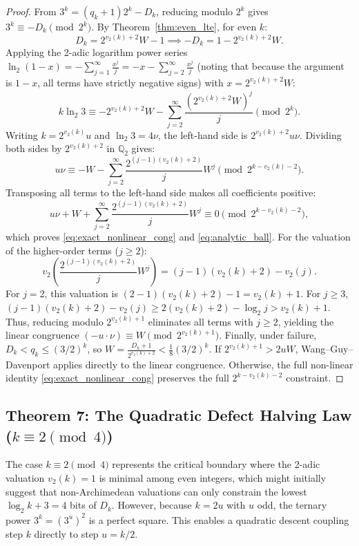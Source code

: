 \documentclass[11pt,reqno]{amsart}
\theoremstyle{definition}
\numberwithin{equation}{section}
\begin{document}
\begin{proof}
From $3^k = (q_k + 1)2^k - D_k$, reducing modulo $2^k$ gives $3^k \equiv -D_k \pmod{2^k}$.
By Theorem~\ref{thm:even_lte}, for even $k$:
\[
D_k = 2^{v_2(k)+2} W - 1 \implies -D_k = 1 - 2^{v_2(k)+2} W.
\]
Applying the 2-adic logarithm power series $\ln_2(1 - x) = -\sum_{j=1}^\infty \frac{x^j}{j} = -x - \sum_{j=2}^\infty \frac{x^j}{j}$ (noting that because the argument is $1 - x$, all terms have strictly negative signs) with $x = 2^{v_2(k)+2} W$:
\[
k \ln_2 3 \equiv -2^{v_2(k)+2} W - \sum_{j=2}^\infty \frac{(2^{v_2(k)+2} W)^j}{j} \pmod{2^k}.
\]
Writing $k = 2^{v_2(k)} u$ and $\ln_2 3 = 4 \nu$, the left-hand side is $2^{v_2(k)+2} u \nu$. Dividing both sides by $2^{v_2(k)+2}$ in $\mathbb{Q}_2$ gives:
\[
u \nu \equiv -W - \sum_{j=2}^\infty \frac{2^{(j-1)(v_2(k)+2)}}{j} W^j \pmod{2^{k - v_2(k) - 2}}.
\]
Transposing all terms to the left-hand side makes all coefficients positive:
\[
u \nu + W + \sum_{j=2}^\infty \frac{2^{(j-1)(v_2(k)+2)}}{j} W^j \equiv 0 \pmod{2^{k - v_2(k) - 2}},
\]
which proves \eqref{eq:exact_nonlinear_cong} and \eqref{eq:analytic_ball}.
For the valuation of the higher-order terms ($j \ge 2$):
\[
v_2\left( \frac{2^{(j-1)(v_2(k)+2)}}{j} W^j \right) = (j-1)(v_2(k)+2) - v_2(j).
\]
For $j = 2$, this valuation is $(2-1)(v_2(k)+2) - 1 = v_2(k) + 1$.
For $j \ge 3$, $(j-1)(v_2(k)+2) - v_2(j) \ge 2(v_2(k)+2) - \log_2 j > v_2(k)+1$.
Thus, reducing modulo $2^{v_2(k)+1}$ eliminates all terms with $j \ge 2$, yielding the linear congruence $(-u \cdot \nu) \equiv W \pmod{2^{v_2(k)+1}}$.
Finally, under failure, $D_k < q_k \le (3/2)^k$, so $W = \frac{D_k + 1}{2^{v_2(k)+2}} < \frac{1}{8}(3/2)^k$. If $2^{v_2(k)+1} > 2 u W$, Wang--Guy--Davenport applies directly to the linear congruence. Otherwise, the full non-linear identity \eqref{eq:exact_nonlinear_cong} preserves the full $2^{k - v_2(k) - 2}$ constraint.
\end{proof}

\subsection{\texorpdfstring{Theorem 7: The Quadratic Defect Halving Law ($k \equiv 2 \pmod 4$)}{Theorem 7: The Quadratic Defect Halving Law (k = 2 mod 4)}}

The case $k \equiv 2 \pmod 4$ represents the critical boundary where the 2-adic valuation $v_2(k) = 1$ is minimal among even integers, which might initially suggest that non-Archimedean valuations can only constrain the lowest $\log_2 k + 3 = 4$ bits of $D_k$. However, because $k = 2u$ with $u$ odd, the ternary power $3^k = (3^u)^2$ is a perfect square. This enables a quadratic descent coupling step $k$ directly to step $u = k/2$.
\end{document}
